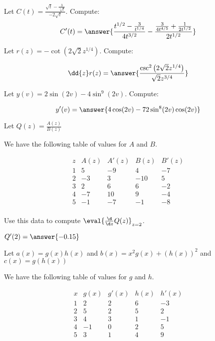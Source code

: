 \documentclass[handout]{ximera}
\begin{document}
\begin{exercise}
Let $C(t) = \frac{ \sqrt{t}-\frac{3}{\sqrt[4]{t}}}{-2 \sqrt{t}}$. Compute:
\[
C'(t)
=\answer{\frac{{t}^{1/2}-\frac{3}{{t}^{1/4}}}{4 t^{3/2}}-\frac{\frac{3}{4 {t}^{4/5}}+\frac{1}{2 {t}^{1/2}}}{2 {t}^{1/2}}}
\]
\end{exercise}

\begin{exercise}
Let $r(z) = -\cot \left(2 \sqrt{2} {z}^{1/4}\right)$. Compute:

\[
\dd{z}r(z)
=\answer{\frac{\csc ^2\left(2 \sqrt{2} {z}^{1/4}\right)}{\sqrt{2} {z}^{3/4}}}
\]
\end{exercise}

\begin{exercise}
Let $y(v) = 2 \sin (2 v)-4 \sin ^9(2 v)$. Compute:

\[
y'(v)
=\answer{4 \cos (2 v)-72 \sin ^8(2 v) \cos (2 v)}
\]
\end{exercise}


\begin{exercise}
Let $Q(z) = \frac{A(z)}{B(z)}$

We have the following table of values for $A$ and $B$.

\[
\begin{array}{c|c|c|c|c}
 z & A(z) & A'(z) & B(z) & B'(z)\\ \hline
 1 & 5 & -9 & 4 & -7\\ 
 2 & -3 & 3 & -10 & 5\\
 3 & 2 &	6&	6	&-2\\
 4 & -7  &	10&	9	&-4\\
 5 & -1&	-7	&-1&	-8\\
\end{array}
\]




Use this data to compute $\eval{\frac{\d}{\d z} Q(z)}_{z = 2}$.

	$Q'(2) = \answer{-0.15}$

\end{exercise}


Let $a(x)=g(x)h(x)$ and $b(x) = x^2g(x)+(h(x))^2$ and $c(x)=g(h(x))$

We have the following table of values for $g$ and $h$.

\[
\begin{array}{c|c|c|c|c}
 x & g(x) & g'(x) & h(x) & h'(x)\\ \hline
 1 & 2 & 2 & 6 & -3\\ 
 2 & 5 & 2 & 5 & 2\\
 3 & 4 & 3 & 1 & -1\\ 
 4 & -1 & 0 & 2 & 5\\ 
 5 & 3 & 1 & 4 & 9\\ 
\end{array}
\]
\end{document}
